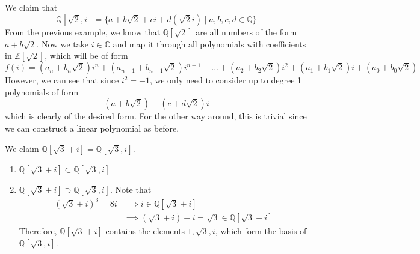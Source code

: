     \begin{example}
      We claim that 
      \begin{equation}
        \mathbb{Q}[\sqrt{2}, i] = \{ a + b \sqrt{2} + ci + d(\sqrt{2} i) \mid a, b, c, d \in \mathbb{Q}\}
      \end{equation}
      From the previous example, we know that $\mathbb{Q}[\sqrt{2}]$ are all numbers of the form $a + b\sqrt{2}$. Now we take $i \in \mathbb{C}$ and map it through all polynomials with coefficients in $\mathbb{Z}[\sqrt{2}]$, which will be of form 
      \begin{equation}
        f(i) = (a_n + b_n \sqrt{2}) i^n + (a_{n-1} + b_{n-1}\sqrt{2}) i^{n-1} + \ldots + (a_2 + b_2 \sqrt{2}) i^2 + (a_1 + b_1 \sqrt{2}) i + (a_0 + b_0 \sqrt{2})
      \end{equation} 
      However, we can see that since $i^2 = -1$, we only need to consider up to degree 1 polynomials of form 
      \begin{equation}
        (a + b \sqrt{2}) + (c + d \sqrt{2}) i 
      \end{equation}
      which is clearly of the desired form. For the other way around, this is trivial since we can construct a linear polynomial as before. 
    \end{example} 

    \begin{example}
      We claim $\mathbb{Q}[\sqrt{3} + i] = \mathbb{Q}[\sqrt{3}, i]$. 
      \begin{enumerate}
        \item $\mathbb{Q}[\sqrt{3} + i] \subset \mathbb{Q}[\sqrt{3}, i]$
        \item $\mathbb{Q}[\sqrt{3} + i] \supset \mathbb{Q}[\sqrt{3}, i]$. Note that 
          \begin{align}
            (\sqrt{3} + i)^3 = 8i & \implies i \in \mathbb{Q}[\sqrt{3} + i] \\
                                  & \implies (\sqrt{3} + i) - i = \sqrt{3} \in \mathbb{Q}[\sqrt{3} + i] 
          \end{align}
          Therefore, $\mathbb{Q}[\sqrt{3} + i]$ contains the elements $1, \sqrt{3}, i$, which form the basis of $\mathbb{Q}[\sqrt{3}, i]$. 
      \end{enumerate}
    \end{example}

